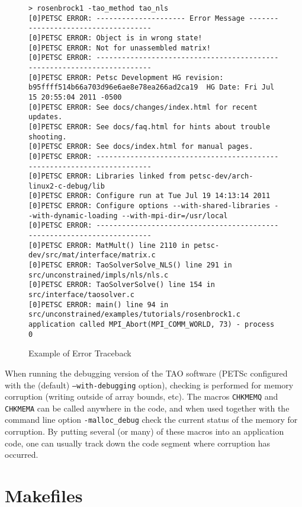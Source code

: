 \begin{figure}[htb]
{\footnotesize
\begin{verbatim}
> rosenbrock1 -tao_method tao_nls
[0]PETSC ERROR: --------------------- Error Message ------------------------------------
[0]PETSC ERROR: Object is in wrong state!
[0]PETSC ERROR: Not for unassembled matrix!
[0]PETSC ERROR: ------------------------------------------------------------------------
[0]PETSC ERROR: Petsc Development HG revision: b95ffff514b66a703d96e6ae8e78ea266ad2ca19  HG Date: Fri Jul 15 20:55:04 2011 -0500
[0]PETSC ERROR: See docs/changes/index.html for recent updates.
[0]PETSC ERROR: See docs/faq.html for hints about trouble shooting.
[0]PETSC ERROR: See docs/index.html for manual pages.
[0]PETSC ERROR: ------------------------------------------------------------------------
[0]PETSC ERROR: Libraries linked from petsc-dev/arch-linux2-c-debug/lib
[0]PETSC ERROR: Configure run at Tue Jul 19 14:13:14 2011
[0]PETSC ERROR: Configure options --with-shared-libraries --with-dynamic-loading --with-mpi-dir=/usr/local
[0]PETSC ERROR: ------------------------------------------------------------------------
[0]PETSC ERROR: MatMult() line 2110 in petsc-dev/src/mat/interface/matrix.c
[0]PETSC ERROR: TaoSolverSolve_NLS() line 291 in src/unconstrained/impls/nls/nls.c
[0]PETSC ERROR: TaoSolverSolve() line 154 in src/interface/taosolver.c
[0]PETSC ERROR: main() line 94 in src/unconstrained/examples/tutorials/rosenbrock1.c
application called MPI_Abort(MPI_COMM_WORLD, 73) - process 0
\end{verbatim}
}
\caption{Example of Error Traceback}
\label{fig:traceback}
\end{figure}

\noindent
When running the debugging version of the TAO software (PETSc configured 
with the (default) \texttt{--with-debugging} option), checking is performed for 
memory corruption
(writing outside of array bounds, etc). The macros \texttt{CHKMEMQ} and
\texttt{CHKMEMA} can be called anywhere in the code, and when used together 
with the command line option \texttt{-malloc\_debug} check the current
status of the memory for corruption.  By putting several (or many) of
these macros into an application code, one can usually track
down the code segment where corruption has occurred.

\section{Makefiles}
\label{sec:makefiles}

